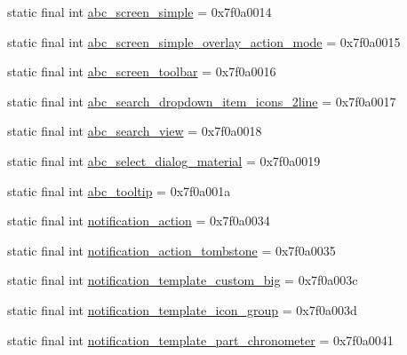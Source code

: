 \begin{DoxyCompactItemize}
\item 
static final int \mbox{\hyperlink{classcom_1_1synnapps_1_1carouselview_1_1_r_1_1layout_ac8117e47557432caa1d463cc9b1f242a}{abc\+\_\+screen\+\_\+simple}} = 0x7f0a0014
\item 
static final int \mbox{\hyperlink{classcom_1_1synnapps_1_1carouselview_1_1_r_1_1layout_ab5f65ffeb1a3b69d137af261d2fb98f4}{abc\+\_\+screen\+\_\+simple\+\_\+overlay\+\_\+action\+\_\+mode}} = 0x7f0a0015
\item 
static final int \mbox{\hyperlink{classcom_1_1synnapps_1_1carouselview_1_1_r_1_1layout_ad919336569967d61c1405b2ca99edcb9}{abc\+\_\+screen\+\_\+toolbar}} = 0x7f0a0016
\item 
static final int \mbox{\hyperlink{classcom_1_1synnapps_1_1carouselview_1_1_r_1_1layout_a9999cc78914d76248aa64ef09aa81b15}{abc\+\_\+search\+\_\+dropdown\+\_\+item\+\_\+icons\+\_\+2line}} = 0x7f0a0017
\item 
static final int \mbox{\hyperlink{classcom_1_1synnapps_1_1carouselview_1_1_r_1_1layout_a99338625813113af20966b6210d96367}{abc\+\_\+search\+\_\+view}} = 0x7f0a0018
\item 
static final int \mbox{\hyperlink{classcom_1_1synnapps_1_1carouselview_1_1_r_1_1layout_ae919b470f6ecaf6fb83b13aa3a9276c2}{abc\+\_\+select\+\_\+dialog\+\_\+material}} = 0x7f0a0019
\item 
static final int \mbox{\hyperlink{classcom_1_1synnapps_1_1carouselview_1_1_r_1_1layout_ad681a25c87c87105759dca01e083efae}{abc\+\_\+tooltip}} = 0x7f0a001a
\item 
static final int \mbox{\hyperlink{classcom_1_1synnapps_1_1carouselview_1_1_r_1_1layout_a4c3b850fbcc905fd1e7120b31ac6dc48}{notification\+\_\+action}} = 0x7f0a0034
\item 
static final int \mbox{\hyperlink{classcom_1_1synnapps_1_1carouselview_1_1_r_1_1layout_a3f469d4a1a4623c523e00fd8f2c51a29}{notification\+\_\+action\+\_\+tombstone}} = 0x7f0a0035
\item 
static final int \mbox{\hyperlink{classcom_1_1synnapps_1_1carouselview_1_1_r_1_1layout_a3c44b4d88c30e8f5956d5af309b81822}{notification\+\_\+template\+\_\+custom\+\_\+big}} = 0x7f0a003c
\item 
static final int \mbox{\hyperlink{classcom_1_1synnapps_1_1carouselview_1_1_r_1_1layout_a47ee5a2411951c99cc87fa1b6c13de19}{notification\+\_\+template\+\_\+icon\+\_\+group}} = 0x7f0a003d
\item 
static final int \mbox{\hyperlink{classcom_1_1synnapps_1_1carouselview_1_1_r_1_1layout_a8492dd94643d3ab594f67a8ed2035107}{notification\+\_\+template\+\_\+part\+\_\+chronometer}} = 0x7f0a0041

\end{DoxyCompactItemize}
